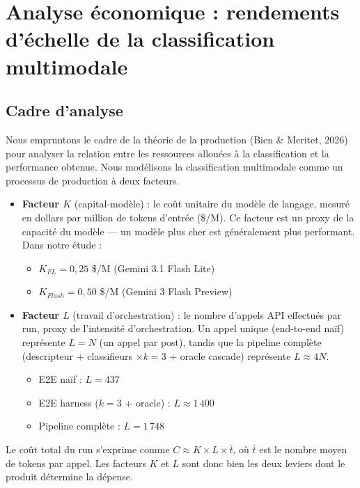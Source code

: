 \section{Analyse économique : rendements d'échelle de la classification multimodale}

\subsection{Cadre d'analyse}

Nous empruntons le cadre de la théorie de la production (Bien \& Meritet, 2026) pour analyser la relation entre les ressources allouées à la classification et la performance obtenue. Nous modélisons la classification multimodale comme un processus de production à deux facteurs.

\begin{itemize}
    \item \textbf{Facteur $K$} (capital-modèle) : le coût unitaire du modèle de langage, mesuré en dollars par million de tokens d'entrée (\$/M). Ce facteur est un proxy de la capacité du modèle --- un modèle plus cher est généralement plus performant. Dans notre étude :
    \begin{itemize}
        \item $K_{FL} = 0{,}25$ \$/M (Gemini 3.1 Flash Lite)
        \item $K_{Flash} = 0{,}50$ \$/M (Gemini 3 Flash Preview)
    \end{itemize}
    \item \textbf{Facteur $L$} (travail d'orchestration) : le nombre d'appels API effectués par run, proxy de l'intensité d'orchestration. Un appel unique (end-to-end naïf) représente $L = N$ (un appel par post), tandis que la pipeline complète (descripteur + classifieurs $\times k=3$ + oracle cascade) représente $L \approx 4N$.
    \begin{itemize}
        \item E2E naïf : $L = 437$
        \item E2E harness ($k=3$ + oracle) : $L \approx 1\,400$
        \item Pipeline complète : $L = 1\,748$
    \end{itemize}
\end{itemize}

Le coût total du run s'exprime comme $C \approx K \times L \times \bar{t}$, où $\bar{t}$ est le nombre moyen de tokens par appel. Les facteurs $K$ et $L$ sont donc bien les deux leviers dont le produit détermine la dépense.

